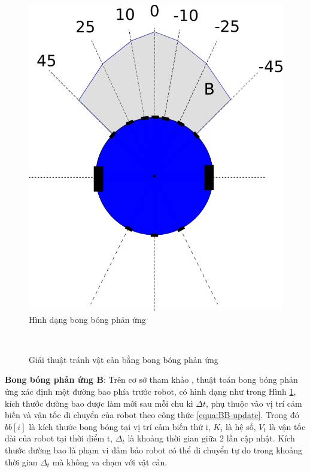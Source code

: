 \begin{figure}[htbp]
    \centering
    \includegraphics[width=0.4\linewidth]{figures/BB-argorithm.png}
    \caption{Hình dạng bong bóng phản ứng}
    \label{fig:BB-argorithm}
\end{figure}

\begin{figure}[htbp]
    \centering
     \\
    \caption{Giải thuật tránh vật cản bằng bong bóng phản ứng}
    \label{fig:BB-avoidance}
\end{figure}

\textbf{Bong bóng phản ứng B}:
Trên cơ sở tham khảo \cite{Susnea2009}, thuật toán bong bóng phản ứng xác định một đường bao phía trước robot, có hình dạng như trong Hình \ref{fig:BB-argorithm}, kích thước đường bao được làm mới sau mỗi chu kì ${\Delta}{t}$, phụ thuộc vào vị trí cảm biến và vận tốc di chuyển của robot theo công thức \ref{equa:BB-update}. Trong đó $bb[i]$ là kích thước bong bóng tại vị trí cảm biến thứ i, $K_i$ là hệ số, $V_t$ là vận tốc dài của robot tại thời điểm t, $\Delta_t$ là khoảng thời gian giữa 2 lần cập nhật.
Kích thước đường bao là phạm vi đảm bảo robot có thể di chuyển tự do trong khoảng thời gian $\Delta_t$ mà không va chạm với vật cản.

